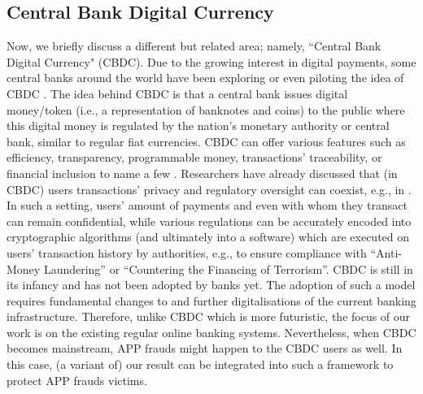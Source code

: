 \subsection{Central Bank Digital Currency}

Now, we briefly discuss a different but related area; namely, ``Central Bank Digital Currency" (CBDC). Due to the growing interest in digital payments, some central banks around the world have been exploring or even piloting the idea of CBDC \cite{CBDC}.  The idea behind CBDC is that a central bank issues digital money/token (i.e., a representation of banknotes and coins) to the public where this digital money is regulated by the nation's monetary authority or central bank, similar to regular fiat currencies. CBDC can offer various features such as efficiency, transparency, programmable money, transactions' traceability, or financial inclusion to name a few \cite{CBDC,CBDC-core-features}. Researchers have already discussed that (in CBDC) users transactions' privacy and regulatory oversight can coexist, e.g., in \cite{abs-2103-00254,WustKCC19}. In such a setting, users' amount of payments and even with whom they transact can remain confidential, while  various regulations can be accurately encoded  into cryptographic algorithms (and ultimately into a software) which are executed on users' transaction history by  authorities, e.g., to ensure compliance with ``Anti-Money Laundering'' or ``Countering the Financing of Terrorism''.  CBDC is still in its infancy and has not been adopted by banks yet. The adoption of such a model requires fundamental changes to and further digitalisations of the current banking  infrastructure. Therefore, unlike CBDC which is more futuristic, the focus of our work is on the existing regular  online banking systems.  Nevertheless, when CBDC becomes mainstream, APP frauds  might happen to the CBDC users as well. In this case, (a variant of) our result can be integrated into  such a framework to protect  APP frauds victims.  





